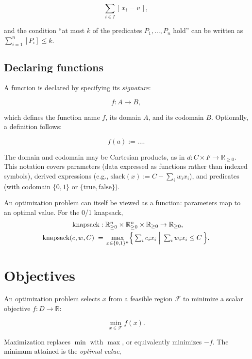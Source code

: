 \[
\sum_{i \in I} [\, x_i = v \,],
\]

and the condition ``at most \(k\) of the predicates \(P_1, \dots, P_n\)
hold'' can be written as \(\sum_{i=1}^{n} [P_i] \le k\).

\subsection{Declaring functions}\label{sec:2.5.3}

A function is declared by specifying its \emph{signature}:

\[
f : A \to B,
\]

which defines the function name \(f\), its domain \(A\), and its
codomain \(B\). Optionally, a definition follows:

\[
f(a) := \dots.
\]

The domain and codomain may be Cartesian products, as in
\(d : C \times F \to \mathbb{R}_{\ge 0}\). This notation covers
parameters (data expressed as functions rather than indexed symbols),
derived expressions (e.g., \(\mathrm{slack}(x) := C - \sum_i w_i x_i\)),
and predicates (with codomain \(\{0,1\}\) or
\(\{\text{true}, \text{false}\}\)).

\begin{platypusinfo}
An optimization problem can itself be viewed as a
function: parameters map to an optimal value. For the 0/1 knapsack,
\begin{align*}
\mathrm{knapsack} :\; & \mathbb{R}_{\ge 0}^{n} \times \mathbb{R}_{\ge 0}^{n} \times \mathbb{R}_{\ge 0} \to \mathbb{R}_{\ge 0}, \\
\mathrm{knapsack}(c, w, C) \;=\; & \max_{x \in \{0,1\}^{n}} \Bigl\{\, \textstyle\sum_{i} c_i x_i \;\Big|\; \sum_i w_i x_i \le C \,\Bigr\}.
\end{align*}
\end{platypusinfo}

\section{Objectives}\label{sec:2.6}

An optimization problem selects \(x\) from a feasible region
\(\mathcal{F}\) to minimize a scalar objective \(f : D \to \mathbb{R}\):

\[
\min_{x \in \mathcal{F}} f(x).
\]

Maximization replaces \(\min\) with \(\max\), or equivalently
minimizes \(-f\). The minimum attained is the \emph{optimal value},

